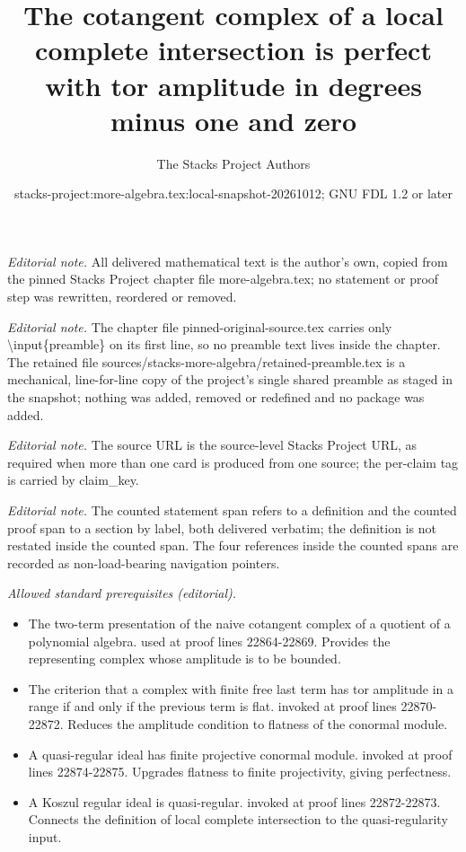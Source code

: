 \documentclass[10pt,a4paper]{amsart}
\title{The cotangent complex of a local complete intersection is perfect with tor amplitude in degrees minus one and zero}
\author{The Stacks Project Authors}
\date{stacks-project:more-algebra.tex:local-snapshot-20261012; GNU FDL 1.2 or later}
\theoremstyle{plain}
\theoremstyle{definition}
\theoremstyle{remark}
\numberwithin{equation}{subsection}
\begin{document}
\maketitle
\setcounter{subsection}{1}
\noindent\textit{Editorial note.} All delivered mathematical text is the author's own, copied from the pinned Stacks Project chapter file more-algebra.tex; no statement or proof step was rewritten, reordered or removed.\par\medskip
\noindent\textit{Editorial note.} The chapter file pinned-original-source.tex carries only \textbackslash{}input\{preamble\} on its first line, so no preamble text lives inside the chapter. The retained file sources/stacks-more-algebra/retained-preamble.tex is a mechanical, line-for-line copy of the project's single shared preamble as staged in the snapshot; nothing was added, removed or redefined and no package was added.\par\medskip
\noindent\textit{Editorial note.} The source URL is the source-level Stacks Project URL, as required when more than one card is produced from one source; the per-claim tag is carried by claim\_key.\par\medskip
\noindent\textit{Editorial note.} The counted statement span refers to a definition and the counted proof span to a section by label, both delivered verbatim; the definition is not restated inside the counted span. The four references inside the counted spans are recorded as non-load-bearing navigation pointers.\par\medskip
\noindent\textit{Allowed standard prerequisites (editorial).}\begin{itemize}
\item The two-term presentation of the naive cotangent complex of a quotient of a polynomial algebra. used at proof lines 22864-22869. Provides the representing complex whose amplitude is to be bounded.
\item The criterion that a complex with finite free last term has tor amplitude in a range if and only if the previous term is flat. invoked at proof lines 22870-22872. Reduces the amplitude condition to flatness of the conormal module.
\item A quasi-regular ideal has finite projective conormal module. invoked at proof lines 22874-22875. Upgrades flatness to finite projectivity, giving perfectness.
\item A Koszul regular ideal is quasi-regular. invoked at proof lines 22872-22873. Connects the definition of local complete intersection to the quasi-regularity input.
\end{itemize}\medskip
\end{document}
